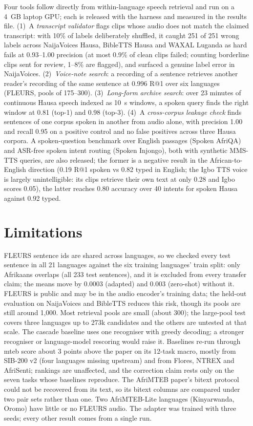 \documentclass[11pt]{article}
\makeatletter
\newcommand{\rone}{R@1}
\makeatother
\begin{document}
Four tools follow directly from within-language speech retrieval and run on a
4~GB laptop GPU; each is released with the harness and measured in the
results file. (1)~A \emph{transcript validator} flags clips whose audio does not
match the claimed transcript: with 10\% of labels deliberately shuffled, it
caught 251 of 251 wrong labels across NaijaVoices Hausa, BibleTTS Hausa and
WAXAL Luganda as hard fails at 0.93--1.00 precision (at most 0.9\% of clean clips failed; counting borderline clips sent for review, 1--8\% are flagged), and
surfaced a genuine label error in NaijaVoices. (2)~\emph{Voice-note search}:
a recording of a sentence retrieves another reader's recording of the same
sentence at 0.996 \rone{} over six languages (FLEURS, pools of 175--300).
(3)~\emph{Long-form archive search}: over 23 minutes of continuous Hausa
speech indexed as 10~s windows, a spoken query finds the right window at 0.81
(top-1) and 0.98 (top-3). (4)~A \emph{cross-corpus leakage check} finds
sentences of one corpus spoken in another from audio alone, with precision
1.00 and recall 0.95 on a positive control and no false positives across three
Hausa corpora. A spoken-question benchmark over English passages (Spoken
AfriQA) and ASR-free spoken intent routing (Spoken Injongo), both with
synthetic MMS-TTS queries, are also released;
the former is a negative result in the African-to-English direction (0.19
\rone{} spoken vs 0.82 typed in English; the Igbo TTS voice is largely unintelligible: its clips retrieve their own text at only 0.28 and Igbo scores 0.05), the latter reaches 0.80 accuracy over
40 intents for spoken Hausa against 0.92 typed.

\section{Limitations}

FLEURS sentence ids are shared across languages, so we checked every test
sentence in all 21 languages against the six training languages' train split:
only Afrikaans overlaps (all 233 test sentences), and it is excluded from every
transfer claim; the means move by 0.0003 (adapted) and 0.003 (zero-shot) without it.
FLEURS is public and may be in the audio encoder's training data; the held-out
evaluation on NaijaVoices and BibleTTS reduces this risk, though its pools are
still around 1,000. Most retrieval pools are small (about 300); the large-pool
test covers three languages up to 273k candidates and the others are untested
at that scale. The cascade baseline uses one recogniser with greedy decoding; a
stronger recogniser or language-model rescoring would raise it. Baselines
re-run through mteb score about 3 points above the paper on its 12-task macro,
mostly from SIB-200 v2 (four languages missing upstream) and from Flores,
NTREX and AfriSenti; rankings are unaffected, and the correction claim rests
only on the seven tasks whose baselines reproduce. The AfriMTEB paper's bitext protocol could not be recovered from its
text, so its bitext columns are compared under two pair sets rather than one.
Two AfriMTEB-Lite languages (Kinyarwanda, Oromo) have little or no FLEURS
audio. The adapter was trained with three seeds; every other result comes from a single run.
\end{document}
